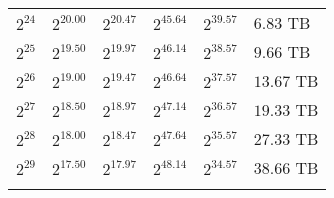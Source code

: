 \begin{tabular}{llllll}
$2^{24}$ & $2^{20.00}$ & $2^{20.47}$ & $2^{45.64}$ & $2^{39.57}$ & $6.83$ TB \\
$2^{25}$ & $2^{19.50}$ & $2^{19.97}$ & $2^{46.14}$ & $2^{38.57}$ & $9.66$ TB \\
$2^{26}$ & $2^{19.00}$ & $2^{19.47}$ & $2^{46.64}$ & $2^{37.57}$ & $13.67$ TB \\
$2^{27}$ & $2^{18.50}$ & $2^{18.97}$ & $2^{47.14}$ & $2^{36.57}$ & $19.33$ TB \\
$2^{28}$ & $2^{18.00}$ & $2^{18.47}$ & $2^{47.64}$ & $2^{35.57}$ & $27.33$ TB \\
$2^{29}$ & $2^{17.50}$ & $2^{17.97}$ & $2^{48.14}$ & $2^{34.57}$ & $38.66$ TB \\
 &  &  &  &  &  \\
\end{tabular}